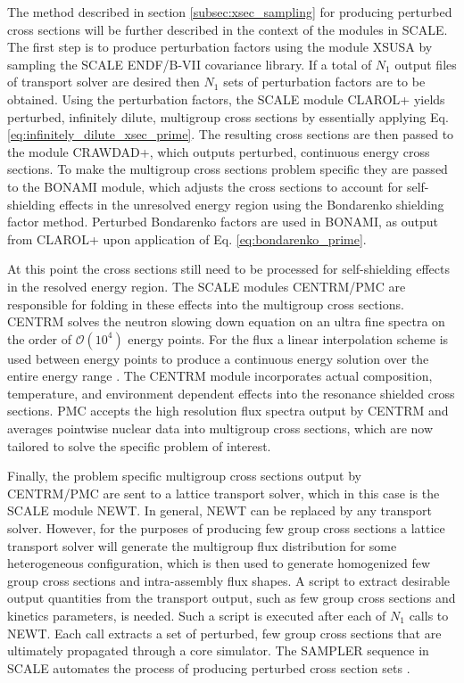 The method described in section \ref{subsec:xsec_sampling} for producing perturbed cross sections will be further described in the context of the modules in \ac{SCALE}. The first step is to produce perturbation factors using the module XSUSA by sampling the \ac{SCALE} \ac{ENDF}/B-VII covariance library. If a total of $N_1$ output files of transport solver are desired then $N_1$ sets of perturbation factors are to be obtained. Using the perturbation factors, the \ac{SCALE} module CLAROL+ yields perturbed, infinitely dilute, multigroup cross sections by essentially applying Eq. \ref{eq:infinitely_dilute_xsec_prime}. The resulting cross sections are then passed to the module CRAWDAD+, which outputs perturbed, continuous energy cross sections. To make the multigroup cross sections problem specific they are passed to the BONAMI module, which adjusts the cross sections to account for self-shielding effects in the unresolved energy region using the Bondarenko shielding factor method. Perturbed Bondarenko factors are used in BONAMI, as output from CLAROL+ upon application of Eq. \ref{eq:bondarenko_prime}.

At this point the cross sections still need to be processed for self-shielding effects in the resolved energy region. The \ac{SCALE} modules CENTRM/PMC are responsible for folding in these effects into the multigroup cross sections. CENTRM solves the neutron slowing down equation on an ultra fine spectra on the order of $\mathcal{O}(10^4)$ energy points. For the flux a linear interpolation scheme is used between energy points to produce a continuous energy solution over the entire energy range \cite{Williams_Gehin}. The CENTRM module incorporates actual composition, temperature, and environment dependent effects into the resonance shielded cross sections. PMC accepts the high resolution flux spectra output by CENTRM and averages pointwise nuclear data into multigroup cross sections, which are now tailored to solve the specific problem of interest.              

Finally, the problem specific multigroup cross sections output by CENTRM/PMC are sent to a lattice transport solver, which in this case is the \ac{SCALE} module NEWT. In general, NEWT can be replaced by any transport solver. However, for the purposes of producing few group cross sections a lattice transport solver will generate the multigroup flux distribution for some heterogeneous configuration, which is then used to generate homogenized few group cross sections and intra-assembly flux shapes. A script to extract desirable output quantities from the transport output, such as few group cross sections and kinetics parameters, is needed. Such a script is executed after each of $N_1$ calls to NEWT. Each call extracts a set of perturbed, few group cross sections that are ultimately propagated through a core simulator. The SAMPLER sequence in \ac{SCALE} automates the process of producing perturbed cross section sets \cite{Williams_Ilas}.      

